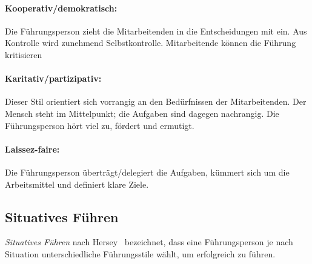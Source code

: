 \paragraph{Kooperativ/demokratisch:} Die Führungsperson zieht die Mitarbeitenden in die Entscheidungen mit ein. Aus Kontrolle wird zunehmend Selbstkontrolle. Mitarbeitende können die Führung kritisieren


\paragraph{Karitativ/partizipativ:} Dieser Stil orientiert sich vorrangig an den Bedürfnissen der Mitarbeitenden. Der Mensch steht im Mittelpunkt; die Aufgaben sind dagegen nachrangig. Die Führungsperson hört viel zu, fördert und ermutigt.


\paragraph{Laissez-faire:} Die Führungsperson überträgt/delegiert die Aufgaben, kümmert sich um die Arbeitsmittel und definiert klare Ziele.

\subsection{Situatives Führen}

\emph{Situatives Führen} nach Hersey~\cite{hersey-management} bezeichnet, dass eine Führungsperson je nach Situation unterschiedliche Führungsstile wählt, um erfolgreich zu führen.
